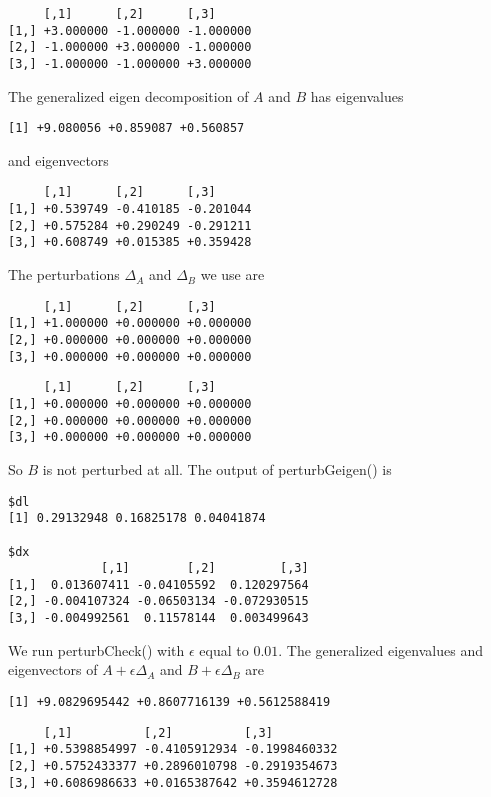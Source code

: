 \documentclass[
  12pt,
  letterpaper,
  DIV=11,
  numbers=noendperiod]{scrartcl}
\begin{document}
\begin{verbatim}
     [,1]      [,2]      [,3]     
[1,] +3.000000 -1.000000 -1.000000
[2,] -1.000000 +3.000000 -1.000000
[3,] -1.000000 -1.000000 +3.000000
\end{verbatim}

The generalized eigen decomposition of \(A\) and \(B\) has eigenvalues

\begin{verbatim}
[1] +9.080056 +0.859087 +0.560857
\end{verbatim}

and eigenvectors

\begin{verbatim}
     [,1]      [,2]      [,3]     
[1,] +0.539749 -0.410185 -0.201044
[2,] +0.575284 +0.290249 -0.291211
[3,] +0.608749 +0.015385 +0.359428
\end{verbatim}

The perturbations \(\Delta_A\) and \(\Delta_B\) we use are

\begin{verbatim}
     [,1]      [,2]      [,3]     
[1,] +1.000000 +0.000000 +0.000000
[2,] +0.000000 +0.000000 +0.000000
[3,] +0.000000 +0.000000 +0.000000
\end{verbatim}

\begin{verbatim}
     [,1]      [,2]      [,3]     
[1,] +0.000000 +0.000000 +0.000000
[2,] +0.000000 +0.000000 +0.000000
[3,] +0.000000 +0.000000 +0.000000
\end{verbatim}

So \(B\) is not perturbed at all. The output of perturbGeigen() is

\begin{verbatim}
$dl
[1] 0.29132948 0.16825178 0.04041874

$dx
             [,1]        [,2]         [,3]
[1,]  0.013607411 -0.04105592  0.120297564
[2,] -0.004107324 -0.06503134 -0.072930515
[3,] -0.004992561  0.11578144  0.003499643
\end{verbatim}

We run perturbCheck() with \(\epsilon\) equal to \(0.01\). The
generalized eigenvalues and eigenvectors of \(A+\epsilon\Delta_A\) and
\(B+\epsilon\Delta_B\) are

\begin{verbatim}
[1] +9.0829695442 +0.8607716139 +0.5612588419
\end{verbatim}

\begin{verbatim}
     [,1]          [,2]          [,3]         
[1,] +0.5398854997 -0.4105912934 -0.1998460332
[2,] +0.5752433377 +0.2896010798 -0.2919354673
[3,] +0.6086986633 +0.0165387642 +0.3594612728
\end{verbatim}
\end{document}
